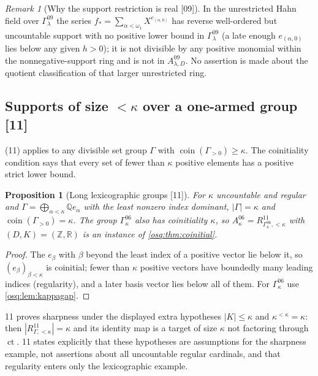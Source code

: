 \documentclass[11pt,letterpaper]{article}
\numberwithin{equation}{section}
\newtheorem{proposition}[proposition]{Proposition}
\theoremstyle{definition}
\theoremstyle{remark}
\newtheorem{remark}[remark]{Remark}
\theoremstyle{plain}
\newcommand{\Z}{\mathbb Z}
\newcommand{\Q}{\mathbb Q}
\newcommand{\R}{\mathbb R}
\newcommand{\ct}{\operatorname{ct}}
\newcommand{\coin}{\operatorname{coin}}
\newcommand{\src}[1]{\textup{\textsf{[#1]}}}
\begin{document}
\begin{remark}[Why the support restriction is real \src{09}]\label{osq:rem:fstar}
In the unrestricted Hahn field over $\Gamma^{09}_\lambda$ the series $f_*=\sum_{\alpha<\omega_1}X^{e_{(\alpha,0)}}$
has reverse well-ordered but uncountable support with no positive lower bound in $\Gamma^{09}_\lambda$ (a late
enough $e_{(\alpha,0)}$ lies below any given $h>0$); it is not divisible by any positive monomial within the
nonnegative-support ring and is not in $A^{09}_{\lambda,D}$. No assertion is made about the quotient
classification of that larger unrestricted ring.
\end{remark}

\subsection{Supports of size \texorpdfstring{$<\kappa$}{< kappa} over a one-armed group \texorpdfstring{\src{11}}{[11]}}\label{osq:sub:model11}

 (11) applies to any divisible set group $\Gamma$ with $\coin(\Gamma_{>0})\ge\kappa$. The
coinitiality condition says that every set of fewer than $\kappa$ positive elements has a positive strict lower
bound.

\begin{proposition}[Long lexicographic groups \src{11}]\label{osq:prop:lex}
For $\kappa$ uncountable and regular and $\Gamma=\bigoplus_{\alpha<\kappa}\Q e_\alpha$ with the least nonzero
index dominant, $|\Gamma|=\kappa$ and $\coin(\Gamma_{>0})=\kappa$. The group $\Gamma^{06}_\kappa$ also has
coinitiality $\kappa$, so $A^{06}_\kappa=R^{11}_{\Gamma^{06}_\kappa,<\kappa}$ with $(D,K)=(\Z,\R)$ is an instance
of \cref{osq:thm:coinitial}.
\end{proposition}
\begin{proof}
The $e_\beta$ with $\beta$ beyond the least index of a positive vector lie below it, so $(e_\beta)_{\beta<\kappa}$
is coinitial; fewer than $\kappa$ positive vectors have boundedly many leading indices (regularity), and a later
basis vector lies below all of them. For $\Gamma^{06}_\kappa$ use \cref{osq:lem:kappagap}.
\end{proof}

11 proves sharpness under the displayed extra hypotheses $|K|\le\kappa$ and $\kappa^{<\kappa}=\kappa$: then
$|R^{11}_{\Gamma,<\kappa}|=\kappa$ and its identity map is a target of size $\kappa$ not factoring through $\ct$.
11 states explicitly that these hypotheses are assumptions for the sharpness example, not assertions about all
uncountable regular cardinals, and that regularity enters only the lexicographic example.
\end{document}

